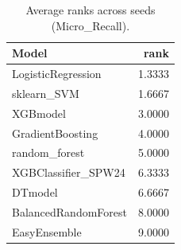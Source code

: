\begin{table}[t]
\centering
\begin{tabular}{lr}
\toprule
Model & rank \\
\midrule
LogisticRegression & 1.3333 \\
sklearn_SVM & 1.6667 \\
XGBmodel & 3.0000 \\
GradientBoosting & 4.0000 \\
random_forest & 5.0000 \\
XGBClassifier_SPW24 & 6.3333 \\
DTmodel & 6.6667 \\
BalancedRandomForest & 8.0000 \\
EasyEnsemble & 9.0000 \\
\bottomrule
\end{tabular}
\caption{Average ranks across seeds (Micro_Recall).}
\label{tab:avg_rank_Micro_Recall}
\end{table}